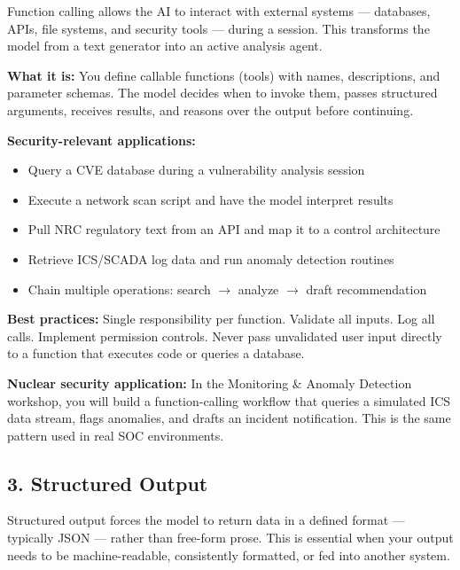 \documentclass[9pt]{extarticle}
\begin{document}
Function calling allows the AI to interact with external systems --- databases,
APIs, file systems, and security tools --- during a session. This transforms
the model from a text generator into an active analysis agent.

\medskip

\textbf{What it is:} You define callable functions (tools) with names, descriptions,
and parameter schemas. The model decides when to invoke them, passes structured
arguments, receives results, and reasons over the output before continuing.

\medskip

\textbf{Security-relevant applications:}
\begin{itemize}
    \item Query a CVE database during a vulnerability analysis session
    \item Execute a network scan script and have the model interpret results
    \item Pull NRC regulatory text from an API and map it to a control architecture
    \item Retrieve ICS/SCADA log data and run anomaly detection routines
    \item Chain multiple operations: search $\rightarrow$ analyze $\rightarrow$
          draft recommendation
\end{itemize}

\textbf{Best practices:} Single responsibility per function. Validate all inputs.
Log all calls. Implement permission controls. Never pass unvalidated user input
directly to a function that executes code or queries a database.

\textbf{Nuclear security application:} In the Monitoring \& Anomaly Detection
workshop, you will build a function-calling workflow that queries a simulated
ICS data stream, flags anomalies, and drafts an incident notification. This
is the same pattern used in real SOC environments.

\subsection*{3. Structured Output}

Structured output forces the model to return data in a defined format ---
typically JSON --- rather than free-form prose. This is essential when your
output needs to be machine-readable, consistently formatted, or fed into
another system.

\medskip
\end{document}

